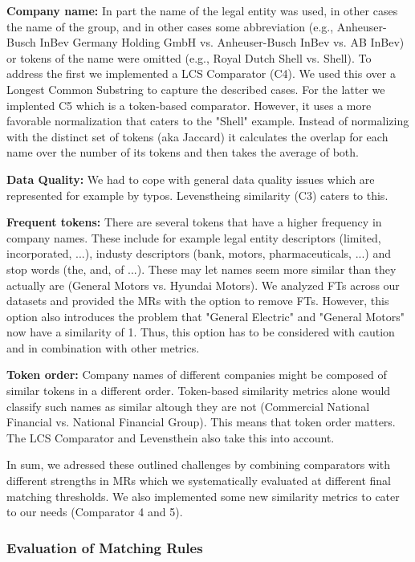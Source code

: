 \documentclass[11pt,titlepage,oneside,openany]{article}
\begin{document}
\textbf{Company name: }In part the name of the legal entity was used, in other cases the name of the group, and in other cases some abbreviation (e.g., Anheuser-Busch InBev Germany Holding GmbH vs. Anheuser-Busch InBev vs. AB InBev) or tokens of the name were omitted (e.g., Royal Dutch Shell vs. Shell). To address the first we implemented a LCS Comparator (C4). We used this over a Longest Common Substring to capture the described cases. For the latter we implented C5 which is a token-based comparator. However, it uses a more favorable normalization that caters to the "Shell" example. Instead of normalizing with the distinct set of tokens (aka Jaccard) it calculates the overlap for each name over the number of its tokens and then takes the average of both.

\textbf{Data Quality:} We had to cope with general data quality issues which are represented for example by typos. Levenstheing similarity (C3) caters to this.

\textbf{Frequent tokens:} There are several tokens that have a higher frequency in company names. These include for example legal entity descriptors (limited, incorporated, ...), industy descriptors (bank, motors, pharmaceuticals, ...) and stop words (the, and, of ...). These may let names seem more similar than they actually are (General Motors vs. Hyundai Motors). We analyzed FTs across our datasets and provided the MRs with the option to remove FTs. However, this option also introduces the problem that "General Electric" and "General Motors" now have a similarity of 1. Thus, this option has to be considered with caution and in combination with other metrics.

\textbf{Token order:} Company names of different companies might be composed of similar tokens in a different order. Token-based similarity metrics alone would classify such names as similar altough they are not (Commercial National Financial vs. National Financial Group). This means that token order matters. The LCS Comparator and Levensthein also take this into account.

In sum, we adressed these outlined challenges by combining comparators with different strengths in MRs which we systematically evaluated at different final matching thresholds. We also implemented some new similarity metrics to cater to our needs (Comparator 4 and 5).



\subsubsection{Evaluation of Matching Rules}
\end{document}
